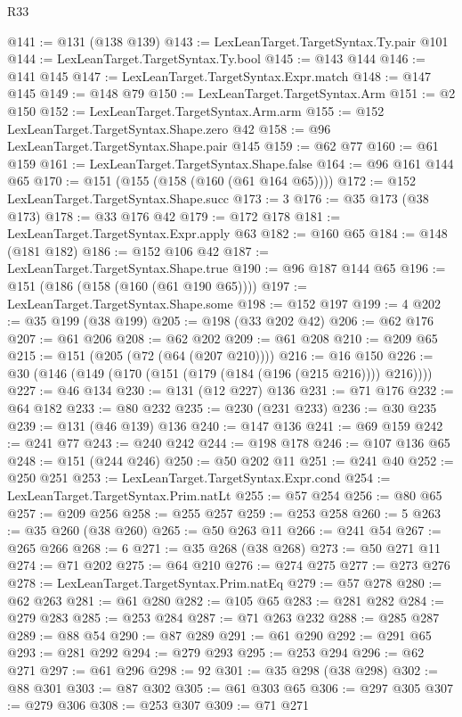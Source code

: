 \begin{lexlean}{R33}
\begin{coremodule}
@141 := @131 (@138 @139)
@143 := LexLeanTarget.TargetSyntax.Ty.pair @101
@144 := LexLeanTarget.TargetSyntax.Ty.bool
@145 := @143 @144
@146 := @141 @145
@147 := LexLeanTarget.TargetSyntax.Expr.match
@148 := @147 @145
@149 := @148 @79
@150 := LexLeanTarget.TargetSyntax.Arm
@151 := @2 @150
@152 := LexLeanTarget.TargetSyntax.Arm.arm
@155 := @152 LexLeanTarget.TargetSyntax.Shape.zero @42
@158 := @96 LexLeanTarget.TargetSyntax.Shape.pair @145
@159 := @62 @77
@160 := @61 @159
@161 := LexLeanTarget.TargetSyntax.Shape.false
@164 := @96 @161 @144 @65
@170 := @151 (@155 (@158 (@160 (@61 @164 @65))))
@172 := @152 LexLeanTarget.TargetSyntax.Shape.succ
@173 := 3
@176 := @35 @173 (@38 @173)
@178 := @33 @176 @42
@179 := @172 @178
@181 := LexLeanTarget.TargetSyntax.Expr.apply @63
@182 := @160 @65
@184 := @148 (@181 @182)
@186 := @152 @106 @42
@187 := LexLeanTarget.TargetSyntax.Shape.true
@190 := @96 @187 @144 @65
@196 := @151 (@186 (@158 (@160 (@61 @190 @65))))
@197 := LexLeanTarget.TargetSyntax.Shape.some
@198 := @152 @197
@199 := 4
@202 := @35 @199 (@38 @199)
@205 := @198 (@33 @202 @42)
@206 := @62 @176
@207 := @61 @206
@208 := @62 @202
@209 := @61 @208
@210 := @209 @65
@215 := @151 (@205 (@72 (@64 (@207 @210))))
@216 := @16 @150
@226 := @30 (@146 (@149 (@170 (@151 (@179 (@184 (@196 (@215 @216)))) @216))))
@227 := @46 @134
@230 := @131 (@12 @227) @136
@231 := @71 @176
@232 := @64 @182
@233 := @80 @232
@235 := @230 (@231 @233)
@236 := @30 @235
@239 := @131 (@46 @139) @136
@240 := @147 @136
@241 := @69 @159
@242 := @241 @77
@243 := @240 @242
@244 := @198 @178
@246 := @107 @136 @65
@248 := @151 (@244 @246)
@250 := @50 @202 @11
@251 := @241 @40
@252 := @250 @251
@253 := LexLeanTarget.TargetSyntax.Expr.cond
@254 := LexLeanTarget.TargetSyntax.Prim.natLt
@255 := @57 @254
@256 := @80 @65
@257 := @209 @256
@258 := @255 @257
@259 := @253 @258
@260 := 5
@263 := @35 @260 (@38 @260)
@265 := @50 @263 @11
@266 := @241 @54
@267 := @265 @266
@268 := 6
@271 := @35 @268 (@38 @268)
@273 := @50 @271 @11
@274 := @71 @202
@275 := @64 @210
@276 := @274 @275
@277 := @273 @276
@278 := LexLeanTarget.TargetSyntax.Prim.natEq
@279 := @57 @278
@280 := @62 @263
@281 := @61 @280
@282 := @105 @65
@283 := @281 @282
@284 := @279 @283
@285 := @253 @284
@287 := @71 @263 @232
@288 := @285 @287
@289 := @88 @54
@290 := @87 @289
@291 := @61 @290
@292 := @291 @65
@293 := @281 @292
@294 := @279 @293
@295 := @253 @294
@296 := @62 @271
@297 := @61 @296
@298 := 92
@301 := @35 @298 (@38 @298)
@302 := @88 @301
@303 := @87 @302
@305 := @61 @303 @65
@306 := @297 @305
@307 := @279 @306
@308 := @253 @307
@309 := @71 @271

\end{coremodule}
\end{lexlean}
